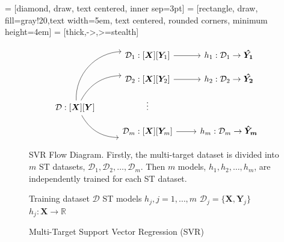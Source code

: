\documentclass{article}
\begin{document}
 = [diamond, draw, text centered, inner sep=3pt]
 = [rectangle, draw, fill=gray!20,text width=5em, text centered, rounded corners, minimum height=4em]
 = [thick,->,>=stealth]


\begin{figure}[t!]
\centering
\begin{minipage}{0.65\textwidth}
\small \centering
\[\begin{tikzcd}[column sep = small, row sep = small]
& & \mathcal{D}_1 :  [\bm X][\bm Y_1]  \arrow[rr]  & & h_1 :  \mathcal{D}_1 \rightarrow \bm{\hat{Y_1}}\\
& & \mathcal{D}_2 :  [\bm X][\bm Y_2]  \arrow[rr] & & h_2 :  \mathcal{D}_2 \rightarrow \bm{\hat{Y_2}} \\        
\mathcal{D} :  [\bm X][\bm Y]  \arrow[uurr, bend left=45] \arrow[urr, bend left] \arrow[drr, bend right]  		& & \vdots \\
& & \mathcal{D}_m :  [\bm X][\bm Y_m] \arrow[rr] & & h_m :  \mathcal{D}_m \rightarrow \bm{\hat{Y}_m}
\end{tikzcd}\]
\caption*{\small SVR Flow Diagram. Firstly, the multi-target dataset is divided into $m$ ST datasets, $\mathcal{D}_1, \mathcal{D}_2, \ldots, \mathcal{D}_m$. Then $m$ models, $h_1, h_2, \ldots, h_m$, are independently trained for each ST dataset.}
\end{minipage}
\begin{minipage}{0.65\textwidth}
\begin{algorithm}[H]
\caption*{Multi-Target Support Vector Regression (SVR)} \label{alg:SVR} 
\small \centering
\begin{algorithmic}[1]
\renewcommand{\algorithmicrequire}{\textbf{Input:}}
\renewcommand{\algorithmicensure}{\textbf{Output:}}
\Require Training dataset $\mathcal{D}$
\Ensure  ST models $h_j, j = 1,\ldots,m$
\State $\mathcal{D}_j = \{\bm X, \bm Y_j\}$ 
\State $h_j : \bm X \rightarrow \mathbb{R}$ 
\EndFor 
\end{algorithmic} 
\end{algorithm}
\end{minipage}
\end{figure}
\end{document}
